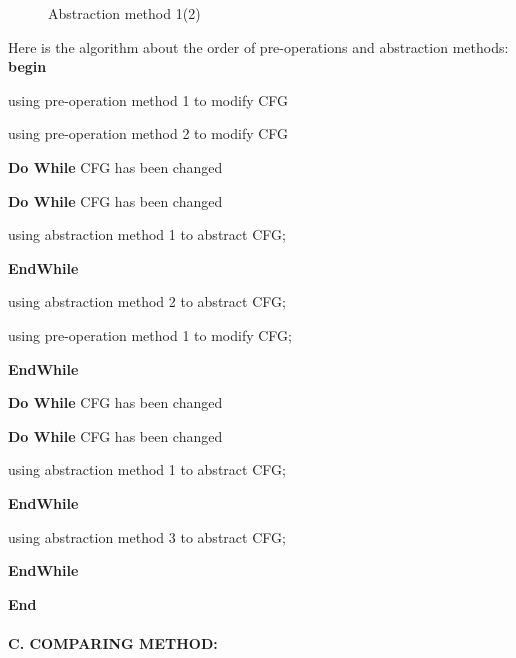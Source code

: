 \documentclass[12pt]{article}
\begin{document}
\begin{figure}
\begin{center}
\begin{minipage}[c]{0.5\textwidth}
\renewcommand{\figurename}{Figure}
\caption{Abstraction method 1(2)  }
\label{}
\end{minipage}
\end{center}
\end{figure}
    

Here is the algorithm about the order of pre-operations and abstraction methods:\\

\textbf{begin}\

\quad using pre-operation method 1 to modify CFG\

\quad using pre-operation method 2 to modify CFG\

\quad \textbf{Do While} CFG has been changed\

\qquad  \textbf{Do While} CFG has been changed\

\qquad \quad using abstraction method 1 to abstract CFG;\

\qquad \textbf{EndWhile}\

\qquad using abstraction method 2 to abstract CFG;\

\qquad using pre-operation method 1 to modify CFG;\

\quad \textbf{EndWhile}\

\quad \textbf{Do While} CFG has been changed\

\qquad \textbf{Do While} CFG has been changed\

\qquad \quad using abstraction method 1 to abstract CFG;\

\qquad \textbf{EndWhile}\

\qquad using abstraction method 3 to abstract CFG;\

\quad \textbf{EndWhile}\

\textbf{End}\\
\\               
\textbf{C. COMPARING METHOD:}\ 
  
\end{document}
